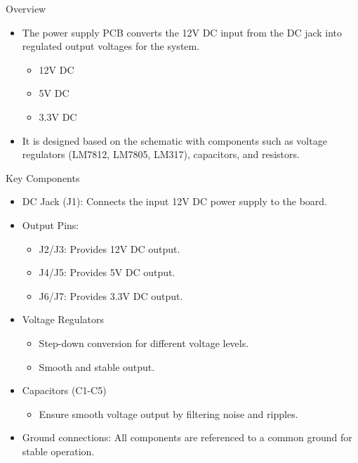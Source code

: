 \documentclass[8pt,compress,aspectratio=169]{beamer}
\begin{document}
\begin{frame}
\begin{minipage}{0.675\textwidth}
\begin{block}{Overview}
\begin{itemize}
          \small
        \item The power supply PCB converts the 12V DC input from the DC jack into regulated output voltages for the system.
          \begin{itemize}
              \tiny
            \item  12V DC
            \item 5V DC
            \item 3.3V DC
          \end{itemize}
        \item It is designed based on the schematic with components such as voltage regulators (LM7812, LM7805, LM317), capacitors, and resistors.
      \end{itemize}
    \end{block}
    \begin{block}{Key Components}
      \begin{itemize}
          \footnotesize
        \item DC Jack (J1): Connects the input 12V DC power supply to the board.
        \item Output Pins:
          \begin{itemize}
              \tiny
            \item J2/J3: Provides 12V DC output.
            \item J4/J5: Provides 5V DC output.
            \item J6/J7: Provides 3.3V DC output.
          \end{itemize}
        \item Voltage Regulators
          \begin{itemize}
              \tiny
            \item Step-down conversion for different voltage levels.
            \item Smooth and stable output.
          \end{itemize}
        \item Capacitors (C1-C5)
          \begin{itemize}
              \tiny
            \item Ensure smooth voltage output by filtering noise and ripples.
          \end{itemize}
        \item Ground connections: All components are referenced to a common ground for stable operation.
      \end{itemize}
    \end{block}
  \end{minipage}
\end{frame}
\end{document}
